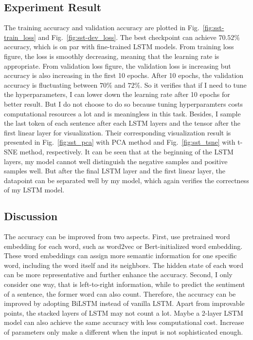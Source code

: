 \subsection{Experiment Result}
The training accuracy and validation accuracy are plotted in Fig.~\ref{fig:sst-train_loss} and Fig.~\ref{fig:sst-dev_loss}. 
The best checkpoint can achieve $70.52\%$ accuracy, which is on par with fine-trained LSTM models.
From training loss figure, the loss is smoothly decreasing, meaning that the learning rate is appropriate.
From validation loss figure, the validation loss is increasing but accuracy is also increasing in the first 10 epochs. 
After 10 epochs, the validation accuracy is fluctuating between $70\%$ and $72\%$.
So it verifies that if I need to tune the hyperparameters, I can lower down the learning rate after 10 epochs for better result.
But I do not choose to do so because tuning hyperparamters costs computational resources a lot and is meaningless in this task.
\newline
\newline
\noindent 
Besides, I sample the last token of each sentence after each LSTM layers and the tensor after the first linear layer for visualization.
Their corresponding visualization result is presented in Fig.~\ref{fig:sst_pca} with PCA method and Fig.~\ref{fig:sst_tsne} with t-SNE method, respectively.
It can be seen that at the beginning of the LSTM layers, my model cannot well distinguish the negative samples and positive samples well.
But after the final LSTM layer and the first linear layer, the datapoint can be separated well by my model, which again verifies the correctness of my LSTM model.

\subsection{Discussion}
The accuracy can be improved from two aspects. First, use pretrained word embedding for each word, such as word2vec or Bert-initialized word embedding. 
These word embeddings can assign more semantic information for one specific word, including the word itself and its neighbors.
The hidden state of each word can be more representative and further enhance the accuracy.
\newline
\newline
\noindent 
Second, I only consider one way, that is left-to-right information, while to predict the sentiment of a sentence, the former word can also count.
Therefore, the accuracy can be improved by adopting BiLSTM instead of vanilla LSTM.
\newline
\newline
\noindent 
Apart from improvable points, the stacked layers of LSTM may not count a lot. 
Maybe a 2-layer LSTM model can also achieve the same accuracy with less computational cost. 
Increase of parameters only make a different when the input is not sophisticated enough.